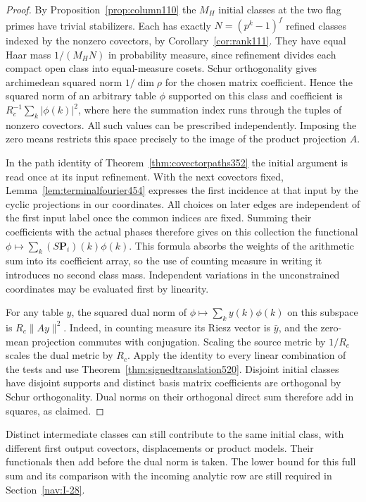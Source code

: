 \documentclass[a4paper,11pt]{article}
\theoremstyle{definition}
\theoremstyle{remark}
\numberwithin{equation}{section}
\begin{document}
\begin{proof}
By Proposition~\ref{prop:column110} the \(M_H\) initial classes
at the two flag primes have trivial stabilizers. Each has exactly
\(N=(p^k-1)^f\) refined classes indexed by the nonzero covectors,
by Corollary~\ref{cor:rank111}. They have equal Haar mass
\(1/(M_H N)\) in probability measure, since refinement divides
each compact open class into equal-measure cosets. Schur
orthogonality gives archimedean squared norm \(1/\dim\rho\) for
the chosen matrix coefficient. Hence the squared norm of an
arbitrary table \(\phi\) supported on this class and coefficient
is \(R_c^{-1}\sum_k |\phi(k)|^2\), where here the summation index
runs through the tuples of nonzero covectors. All such values can
be prescribed independently. Imposing the zero means restricts
this space precisely to the image of the product projection \(A\).

In the path identity of Theorem~\ref{thm:covectorpaths352} the
initial argument is read once at its input refinement. With the
next covectors fixed, Lemma~\ref{lem:terminalfourier454} expresses
the first incidence at that input by the cyclic projections in
our coordinates. All choices on later edges are independent of
the first input label once the common indices are fixed. Summing
their coefficients with the actual phases therefore gives on this
collection the functional \(\phi\mapsto\sum_k (S\boldsymbol P_i)(k)
\phi(k)\). This formula absorbs the weights of the arithmetic
sum into its coefficient array, so the use of counting measure in
writing it introduces no second class mass. Independent variations
in the unconstrained coordinates may be evaluated first by linearity.

For any table \(y\), the squared dual norm of \(\phi\mapsto
\sum_k y(k)\phi(k)\) on this subspace is \(R_c\|Ay\|^2\). Indeed,
in counting measure its Riesz vector is \(\bar y\), and the
zero-mean projection commutes with conjugation. Scaling the
source metric by \(1/R_c\) scales the dual metric by \(R_c\).
Apply the identity to every linear combination of the tests and
use Theorem~\ref{thm:signedtranslation520}. Disjoint initial
classes have disjoint supports and distinct basis matrix coefficients
are orthogonal by Schur orthogonality. Dual norms on their
orthogonal direct sum therefore add in squares, as claimed.
\end{proof}

Distinct intermediate classes can still contribute to the same
initial class, with different first output covectors, displacements
or product models. Their functionals then add before the dual norm
is taken. The lower bound for this full sum and its comparison with
the incoming analytic row are still required in Section~\ref{nav:I-28}.
\end{document}
